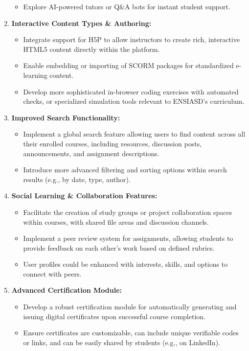 \begin{enumerate}
\begin{itemize}
        \item Explore AI-powered tutors or Q\&A bots for instant student support.
    \end{itemize}
    \item \textbf{Interactive Content Types \& Authoring:}
    \begin{itemize}
        \item Integrate support for H5P to allow instructors to create rich, interactive HTML5 content directly within the platform.
        \item Enable embedding or importing of SCORM packages for standardized e-learning content.
        \item Develop more sophisticated in-browser coding exercises with automated checks, or specialized simulation tools relevant to ENSIASD's curriculum.
    \end{itemize}
    \item \textbf{Improved Search Functionality:}
    \begin{itemize}
        \item Implement a global search feature allowing users to find content across all their enrolled courses, including resources, discussion posts, announcements, and assignment descriptions.
        \item Introduce more advanced filtering and sorting options within search results (e.g., by date, type, author).
    \end{itemize}
    \item \textbf{Social Learning \& Collaboration Features:}
    \begin{itemize}
        \item Facilitate the creation of study groups or project collaboration spaces within courses, with shared file areas and discussion channels.
        \item Implement a peer review system for assignments, allowing students to provide feedback on each other's work based on defined rubrics.
        \item User profiles could be enhanced with interests, skills, and options to connect with peers.
    \end{itemize}
    \item \textbf{Advanced Certification Module:}
    \begin{itemize}
        \item Develop a robust certification module for automatically generating and issuing digital certificates upon successful course completion.
        \item Ensure certificates are customizable, can include unique verifiable codes or links, and can be easily shared by students (e.g., on LinkedIn).
    \end{itemize}
\end{enumerate}

